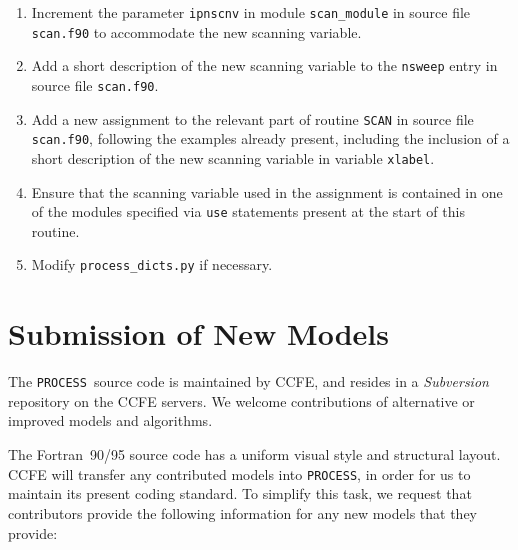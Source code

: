 \documentclass[11pt,a4paper]{report}
\newcommand{\process}{\mbox{\texttt{PROCESS}}}
\begin{document}
\begin{enumerate}

\item Increment the parameter \texttt{ipnscnv} in module \texttt{scan\_module}
  in source file \texttt{scan.f90} to accommodate the new scanning variable.

\item Add a short description of the new scanning variable to the
  \texttt{nsweep} entry in source file \texttt{scan.f90}.

\item Add a new assignment to the relevant part of routine \texttt{SCAN} in
  source file \texttt{scan.f90}, following the examples already present,
  including the inclusion of a short description of the new scanning variable
  in variable \texttt{xlabel}.

\item Ensure that the scanning variable used in the assignment is contained in
  one of the modules specified via \texttt{use} statements present at the
  start of this routine.

\item Modify \texttt{process\_dicts.py} if necessary.

\end{enumerate}

\section{Submission of New Models}

The \process\ source code is maintained by CCFE, and resides in a
\textit{Subversion}~\cite{svn} repository on the CCFE servers. We welcome
contributions of alternative or improved models and algorithms.

The Fortran~90/95 source code has a uniform visual style and structural
layout. CCFE will transfer any contributed models into \process, in order for
us to maintain its present coding standard. To simplify this task, we request
that contributors provide the following information for any new models that
they provide:
\end{document}
